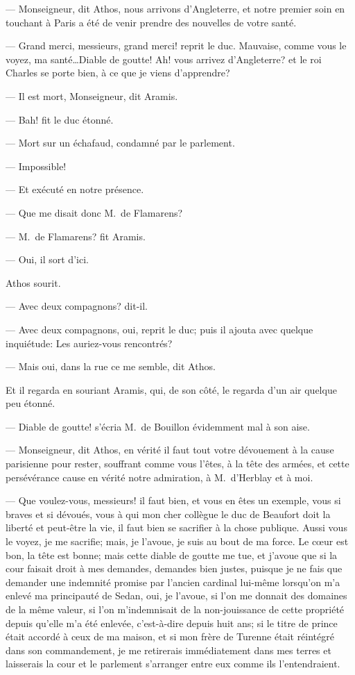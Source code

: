 — Monseigneur, dit Athos, nous arrivons d'Angleterre, et notre premier soin en touchant à Paris a été de venir prendre des nouvelles de votre santé.

— Grand merci, messieurs, grand merci! reprit le duc. Mauvaise, comme vous le voyez, ma santé\dots Diable de goutte! Ah! vous arrivez d'Angleterre? et le roi Charles se porte bien, à ce que je viens d'apprendre?

— Il est mort, Monseigneur, dit Aramis.

— Bah! fit le duc étonné.

— Mort sur un échafaud, condamné par le parlement.

— Impossible!

— Et exécuté en notre présence.

— Que me disait donc M.~de Flamarens?

— M.~de Flamarens? fit Aramis.

— Oui, il sort d'ici.

Athos sourit.

— Avec deux compagnons? dit-il.

— Avec deux compagnons, oui, reprit le duc; puis il ajouta avec quelque inquiétude: Les auriez-vous rencontrés?

— Mais oui, dans la rue ce me semble, dit Athos.

Et il regarda en souriant Aramis, qui, de son côté, le regarda d'un air quelque peu étonné.

— Diable de goutte! s'écria M.~de Bouillon évidemment mal à son aise.

— Monseigneur, dit Athos, en vérité il faut tout votre dévouement à la cause parisienne pour rester, souffrant comme vous l'êtes, à la tête des armées, et cette persévérance cause en vérité notre admiration, à M.~d'Herblay et à moi.

— Que voulez-vous, messieurs! il faut bien, et vous en êtes un exemple, vous si braves et si dévoués, vous à qui mon cher collègue le duc de Beaufort doit la liberté et peut-être la vie, il faut bien se sacrifier à la chose publique. Aussi vous le voyez, je me sacrifie; mais, je l'avoue, je suis au bout de ma force. Le cœur est bon, la tête est bonne; mais cette diable de goutte me tue, et j'avoue que si la cour faisait droit à mes demandes, demandes bien justes, puisque je ne fais que demander une indemnité promise par l'ancien cardinal lui-même lorsqu'on m'a enlevé ma principauté de Sedan, oui, je l'avoue, si l'on me donnait des domaines de la même valeur, si l'on m'indemnisait de la non-jouissance de cette propriété depuis qu'elle m'a été enlevée, c'est-à-dire depuis huit ans; si le titre de prince était accordé à ceux de ma maison, et si mon frère de Turenne était réintégré dans son commandement, je me retirerais immédiatement dans mes terres et laisserais la cour et le parlement s'arranger entre eux comme ils l'entendraient.

